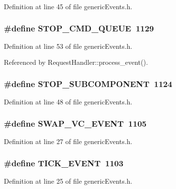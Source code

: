 Definition at line 45 of file genericEvents.h.
\subsubsection[{STOP\_\-CMD\_\-QUEUE}]{\setlength{\rightskip}{0pt plus 5cm}\#define STOP\_\-CMD\_\-QUEUE~1129}\label{genericEvents_8h_54c4c4ff778c990010083c63d6dc3246}




Definition at line 53 of file genericEvents.h.

Referenced by RequestHandler::process\_\-event().
\subsubsection[{STOP\_\-SUBCOMPONENT}]{\setlength{\rightskip}{0pt plus 5cm}\#define STOP\_\-SUBCOMPONENT~1124}\label{genericEvents_8h_c5240d090737bcebd4af1721a5024df0}




Definition at line 48 of file genericEvents.h.
\subsubsection[{SWAP\_\-VC\_\-EVENT}]{\setlength{\rightskip}{0pt plus 5cm}\#define SWAP\_\-VC\_\-EVENT~1105}\label{genericEvents_8h_38e9e594550b462e9bb96da764610ae2}




Definition at line 27 of file genericEvents.h.
\subsubsection[{TICK\_\-EVENT}]{\setlength{\rightskip}{0pt plus 5cm}\#define TICK\_\-EVENT~1103}\label{genericEvents_8h_77d17ab12ee6849392d893363e59381a}




Definition at line 25 of file genericEvents.h.

